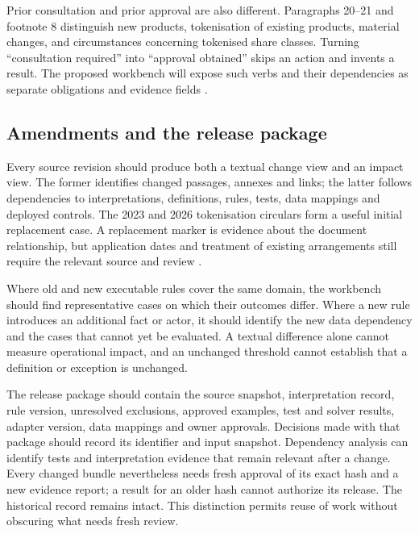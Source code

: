 \documentclass[12pt,a4paper,oneside,openany]{book}
\begin{document}
Prior consultation and prior approval are also different. Paragraphs 20--21 and
footnote 8 distinguish new products, tokenisation of existing products, material
changes, and circumstances concerning tokenised share classes. Turning
``consultation required'' into ``approval obtained'' skips an action and invents
a result. The proposed workbench will expose such verbs and their dependencies
as separate obligations and evidence fields \citep[paras.~20--21 and n.~8]{sfctoken2026}.

\subsection{Amendments and the release package}
\label{merge:P-03-product:09}


Every source revision should produce both a textual change view and an impact
view. The former identifies changed passages, annexes and links; the latter
follows dependencies to interpretations, definitions, rules, tests, data mappings
and deployed controls. The 2023 and 2026 tokenisation circulars form a useful
initial replacement case. A replacement marker is evidence about the document
relationship, but application dates and treatment of existing arrangements still
require the relevant source and review \citep{sfctoken2023,sfctoken2026}.

Where old and new executable rules cover the same domain, the workbench should
find representative cases on which their outcomes differ. Where a new rule
introduces an additional fact or actor, it should identify the new data dependency
and the cases that cannot yet be evaluated. A textual difference alone cannot
measure operational impact, and an unchanged threshold cannot establish that a
definition or exception is unchanged.

The release package should contain the source snapshot, interpretation record,
rule version, unresolved exclusions, approved examples, test and solver results,
adapter version, data mappings and owner approvals. Decisions made with that
package should record its identifier and input snapshot. Dependency analysis can
identify tests and interpretation evidence that remain relevant after a change.
Every changed bundle nevertheless needs fresh approval of its exact hash and a
new evidence report; a result for an older hash cannot authorize its release.
The historical record remains intact. This distinction permits reuse of work
without obscuring what needs fresh review.
\end{document}
